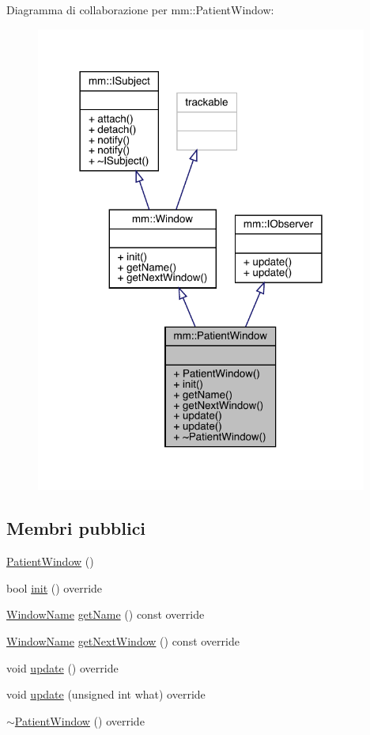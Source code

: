 Diagramma di collaborazione per mm\+:\+:Patient\+Window\+:
\nopagebreak
\begin{figure}[H]
\begin{center}
\leavevmode
\includegraphics[width=309pt]{d2/da5/classmm_1_1_patient_window__coll__graph}
\end{center}
\end{figure}
\subsection*{Membri pubblici}
\begin{DoxyCompactItemize}
\item 
\mbox{\hyperlink{classmm_1_1_patient_window_a303da04da191185a070454feff15e014}{Patient\+Window}} ()
\item 
bool \mbox{\hyperlink{classmm_1_1_patient_window_a0ad27245769b095559858eeecdbb7089}{init}} () override
\item 
\mbox{\hyperlink{namespacemm_a4e9d92e04f65dbf2fc1963947da0d93c}{Window\+Name}} \mbox{\hyperlink{classmm_1_1_patient_window_ab951ab5bf21df2b9450496c6faca5268}{get\+Name}} () const override
\item 
\mbox{\hyperlink{namespacemm_a4e9d92e04f65dbf2fc1963947da0d93c}{Window\+Name}} \mbox{\hyperlink{classmm_1_1_patient_window_ae22b9bce4c7ccdbcc45feb080088a558}{get\+Next\+Window}} () const override
\item 
void \mbox{\hyperlink{classmm_1_1_patient_window_a461de186f72a8902a9f95a622dc1c02b}{update}} () override
\item 
void \mbox{\hyperlink{classmm_1_1_patient_window_a315f5e823a0261db4fb88b4e31333d53}{update}} (unsigned int what) override
\item 
\mbox{\hyperlink{classmm_1_1_patient_window_a48de0e9302eb9cb9b33e8641f27f01c1}{$\sim$\+Patient\+Window}} () override
\end{DoxyCompactItemize}


